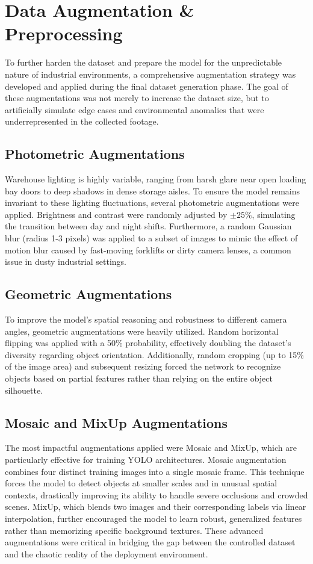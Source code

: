 \section{Data Augmentation \& Preprocessing}
To further harden the dataset and prepare the model for the unpredictable nature of industrial environments, a comprehensive augmentation strategy was developed and applied during the final dataset generation phase. The goal of these augmentations was not merely to increase the dataset size, but to artificially simulate edge cases and environmental anomalies that were underrepresented in the collected footage.

\subsection{Photometric Augmentations}
Warehouse lighting is highly variable, ranging from harsh glare near open loading bay doors to deep shadows in dense storage aisles. To ensure the model remains invariant to these lighting fluctuations, several photometric augmentations were applied. Brightness and contrast were randomly adjusted by $\pm 25\%$, simulating the transition between day and night shifts. Furthermore, a random Gaussian blur (radius 1-3 pixels) was applied to a subset of images to mimic the effect of motion blur caused by fast-moving forklifts or dirty camera lenses, a common issue in dusty industrial settings.

\subsection{Geometric Augmentations}
To improve the model's spatial reasoning and robustness to different camera angles, geometric augmentations were heavily utilized. Random horizontal flipping was applied with a 50\% probability, effectively doubling the dataset's diversity regarding object orientation. Additionally, random cropping (up to 15\% of the image area) and subsequent resizing forced the network to recognize objects based on partial features rather than relying on the entire object silhouette.

\subsection{Mosaic and MixUp Augmentations}
The most impactful augmentations applied were Mosaic and MixUp, which are particularly effective for training YOLO architectures. Mosaic augmentation combines four distinct training images into a single mosaic frame. This technique forces the model to detect objects at smaller scales and in unusual spatial contexts, drastically improving its ability to handle severe occlusions and crowded scenes. MixUp, which blends two images and their corresponding labels via linear interpolation, further encouraged the model to learn robust, generalized features rather than memorizing specific background textures. These advanced augmentations were critical in bridging the gap between the controlled dataset and the chaotic reality of the deployment environment.

